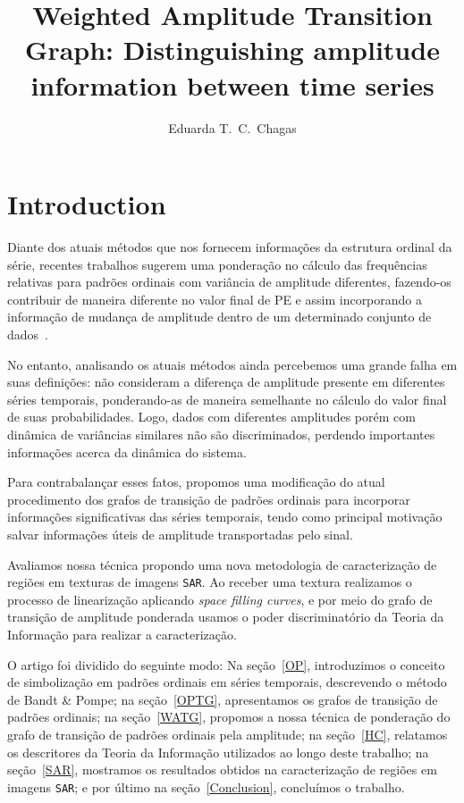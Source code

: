 \documentclass[12pt]{article}
\title{Weighted Amplitude Transition Graph: Distinguishing amplitude information between time series}
\author{Eduarda T.\ C.\ Chagas\inst{1}}
\begin{document}
\maketitle

\section{Introduction}\label{Intro}

Diante dos atuais métodos que nos fornecem informações da estrutura ordinal da série, recentes trabalhos sugerem uma ponderação no cálculo das frequências relativas para padrões ordinais com variância de amplitude diferentes, fazendo-os contribuir de maneira diferente no valor final de PE e assim incorporando a informação de mudança de amplitude dentro de um determinado conjunto de dados~\citep{Fadlallah2013Weightedpermutation}.

No entanto, analisando os atuais métodos ainda percebemos uma grande falha em suas definições: não consideram a diferença de amplitude presente em diferentes séries temporais, ponderando-as de maneira semelhante no cálculo do valor final de suas probabilidades.
Logo, dados com diferentes amplitudes porém com dinâmica de variâncias similares não são discriminados, perdendo importantes informações acerca da dinâmica do sistema.

Para contrabalançar esses fatos, propomos uma modificação do atual procedimento dos grafos de transição de padrões ordinais para incorporar informações significativas das séries temporais, tendo como principal motivação salvar informações úteis de amplitude transportadas pelo sinal.

Avaliamos nossa técnica propondo uma nova metodologia de caracterização de regiões em texturas de imagens \texttt{SAR}. 
Ao receber uma textura realizamos o processo de linearização aplicando \textit{space filling curves}, e por meio do grafo de transição de amplitude ponderada usamos o poder discriminatório da Teoria da Informação para realizar a caracterização.

O artigo foi dividido do seguinte modo: 
Na seção~\ref{OP}, introduzimos o conceito de simbolização em padrões ordinais em séries temporais, descrevendo o método de Bandt \& Pompe; 
na seção~\ref{OPTG}, apresentamos os grafos de transição de padrões ordinais;
na seção~\ref{WATG}, propomos a nossa técnica de ponderação do grafo de transição de padrões ordinais pela amplitude;
na seção~\ref{HC}, relatamos os descritores da Teoria da Informação utilizados ao longo deste trabalho;
na seção~\ref{SAR}, mostramos os resultados obtidos na caracterização de regiões em imagens \texttt{SAR};
e por último na seção~\ref{Conclusion}, concluímos o trabalho.
\end{document}
